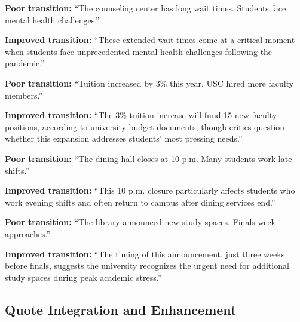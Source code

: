 \documentclass[12pt]{article}
\begin{document}
\begin{beforebox}
\textbf{Poor transition:}
``The counseling center has long wait times. Students face mental health challenges.''
\end{beforebox}

\begin{afterbox}
\textbf{Improved transition:}
``These extended wait times come at a critical moment when students face unprecedented mental health challenges following the pandemic.''
\end{afterbox}
\newpage
\begin{beforebox}
\textbf{Poor transition:}
``Tuition increased by 3\% this year. USC hired more faculty members.''
\end{beforebox}

\begin{afterbox}
\textbf{Improved transition:}
``The 3\% tuition increase will fund 15 new faculty positions, according to university budget documents, though critics question whether this expansion addresses students' most pressing needs.''
\end{afterbox}

\begin{beforebox}
\textbf{Poor transition:}
``The dining hall closes at 10 p.m. Many students work late shifts.''
\end{beforebox}

\begin{afterbox}
\textbf{Improved transition:}
``This 10 p.m. closure particularly affects students who work evening shifts and often return to campus after dining services end.''
\end{afterbox}

\begin{beforebox}
\textbf{Poor transition:}
``The library announced new study spaces. Finals week approaches.''
\end{beforebox}

\begin{afterbox}
\textbf{Improved transition:}
``The timing of this announcement, just three weeks before finals, suggests the university recognizes the urgent need for additional study spaces during peak academic stress.''
\end{afterbox}
\newpage
\subsection{Quote Integration and Enhancement}
\label{sec:quote-verification}
\end{document}
